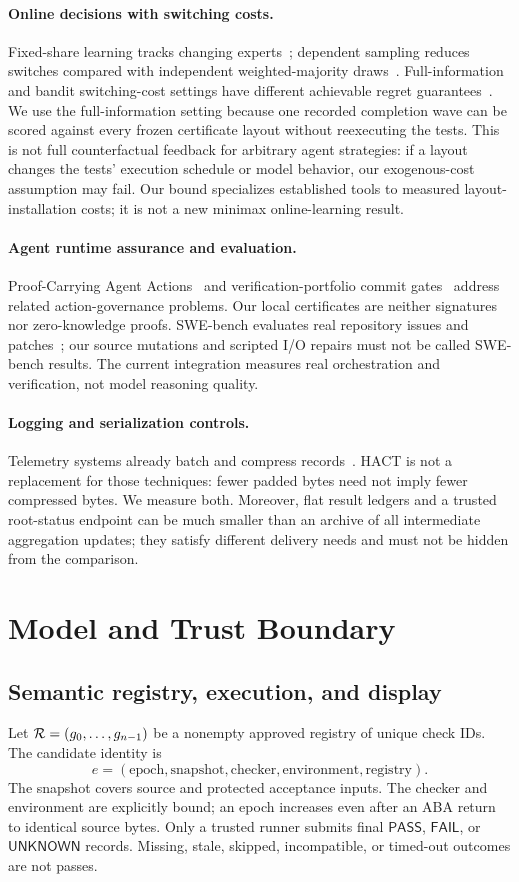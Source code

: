 \documentclass[11pt]{article}
\theoremstyle{definition}\newtheorem{definition}[theorem]{Definition}
\newcommand{\PASS}{\mathsf{PASS}}\newcommand{\FAIL}{\mathsf{FAIL}}\newcommand{\UNKNOWN}{\mathsf{UNKNOWN}}
\begin{document}
\paragraph{Online decisions with switching costs.}
Fixed-share learning tracks changing experts~\cite{herbster}; dependent sampling reduces switches compared with independent weighted-majority draws~\cite{geulen}. Full-information and bandit switching-cost settings have different achievable regret guarantees~\cite{cesa}. We use the full-information setting because one recorded completion wave can be scored against every frozen certificate layout without reexecuting the tests. This is not full counterfactual feedback for arbitrary agent strategies: if a layout changes the tests' execution schedule or model behavior, our exogenous-cost assumption may fail. Our bound specializes established tools to measured layout-installation costs; it is not a new minimax online-learning result.

\paragraph{Agent runtime assurance and evaluation.}
Proof-Carrying Agent Actions~\cite{pcaa} and verification-portfolio commit gates~\cite{vpcontrol} address related action-governance problems. Our local certificates are neither signatures nor zero-knowledge proofs. SWE-bench evaluates real repository issues and patches~\cite{swebench}; our source mutations and scripted I/O repairs must not be called SWE-bench results. The current integration measures real orchestration and verification, not model reasoning quality.

\paragraph{Logging and serialization controls.}
Telemetry systems already batch and compress records~\cite{otel}. HACT is not a replacement for those techniques: fewer padded bytes need not imply fewer compressed bytes. We measure both. Moreover, flat result ledgers and a trusted root-status endpoint can be much smaller than an archive of all intermediate aggregation updates; they satisfy different delivery needs and must not be hidden from the comparison.

\section{Model and Trust Boundary}\label{sec:model}
\subsection{Semantic registry, execution, and display}
Let $\mathcal R=(g_0,\ldots,g_{n-1})$ be a nonempty approved registry of unique check IDs. The candidate identity is
\[
 e=(\mathrm{epoch},\mathrm{snapshot},\mathrm{checker},\mathrm{environment},\mathrm{registry}).
\]
The snapshot covers source and protected acceptance inputs. The checker and environment are explicitly bound; an epoch increases even after an ABA return to identical source bytes. Only a trusted runner submits final $\PASS$, $\FAIL$, or $\UNKNOWN$ records. Missing, stale, skipped, incompatible, or timed-out outcomes are not passes.
\end{document}
